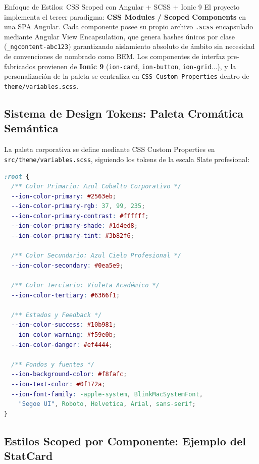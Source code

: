 \documentclass[11pt,a4paper]{article}
\begin{document}
\begin{designBox}{Enfoque de Estilos: CSS Scoped con Angular + SCSS + Ionic 9}
El proyecto implementa el tercer paradigma: \textbf{CSS Modules / Scoped Components} en una SPA Angular. Cada componente posee su propio archivo \texttt{.scss} encapsulado mediante Angular View Encapsulation, que genera hashes únicos por clase (\texttt{\_ngcontent-abc123}) garantizando aislamiento absoluto de ámbito sin necesidad de convenciones de nombrado como BEM. Los componentes de interfaz pre-fabricados provienen de \textbf{Ionic 9} (\texttt{ion-card}, \texttt{ion-button}, \texttt{ion-grid}...), y la personalización de la paleta se centraliza en \texttt{CSS Custom Properties} dentro de \texttt{theme/variables.scss}.
\end{designBox}

\subsection{Sistema de Design Tokens: Paleta Cromática Semántica}

La paleta corporativa se define mediante CSS Custom Properties en \texttt{src/theme/variables.scss}, siguiendo los tokens de la escala Slate profesional:

\begin{lstlisting}[language=CSS, caption={Tokens de diseño semánticos en variables.scss}]
:root {
  /** Color Primario: Azul Cobalto Corporativo */
  --ion-color-primary: #2563eb;
  --ion-color-primary-rgb: 37, 99, 235;
  --ion-color-primary-contrast: #ffffff;
  --ion-color-primary-shade: #1d4ed8;
  --ion-color-primary-tint: #3b82f6;

  /** Color Secundario: Azul Cielo Profesional */
  --ion-color-secondary: #0ea5e9;

  /** Color Terciario: Violeta Académico */
  --ion-color-tertiary: #6366f1;

  /** Estados y Feedback */
  --ion-color-success: #10b981;
  --ion-color-warning: #f59e0b;
  --ion-color-danger: #ef4444;

  /** Fondos y fuentes */
  --ion-background-color: #f8fafc;
  --ion-text-color: #0f172a;
  --ion-font-family: -apple-system, BlinkMacSystemFont,
    "Segoe UI", Roboto, Helvetica, Arial, sans-serif;
}
\end{lstlisting}

\subsection{Estilos Scoped por Componente: Ejemplo del StatCard}
\end{document}
